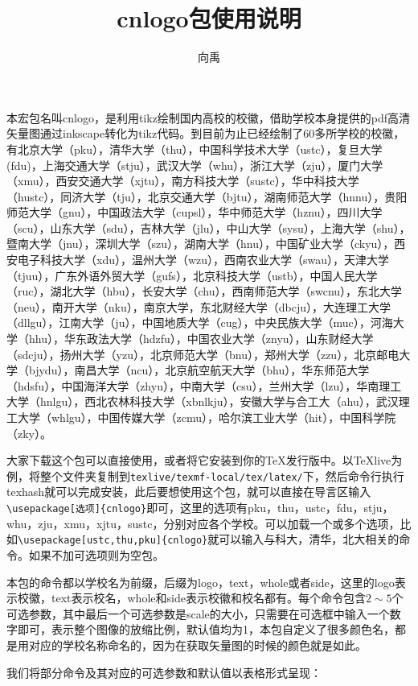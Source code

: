\documentclass{ctexart}
\title{cnlogo包使用说明}\author{向禹}
\begin{document}
\maketitle
本宏包名叫cnlogo，是利用tikz绘制国内高校的校徽，借助学校本身提供的pdf高清矢量图通过inkscape转化为tikz代码。到目前为止已经绘制了60多所学校的校徽，有北京大学（pku），清华大学（thu），中国科学技术大学（ustc），复旦大学(fdu)，上海交通大学（stju），武汉大学（whu），浙江大学（zju），厦门大学（xmu），西安交通大学（xjtu），南方科技大学（sustc），华中科技大学（hustc），同济大学（tju），北京交通大学（bjtu），湖南师范大学（hnnu），贵阳师范大学（gnu），中国政法大学（cupsl），华中师范大学（hznu），四川大学（scu），山东大学（sdu），吉林大学（jlu），中山大学（sysu），上海大学（shu），暨南大学（jnu），深圳大学（szu），湖南大学（hnu），中国矿业大学（ckyu），西安电子科技大学（xdu），温州大学（wzu），西南农业大学（swau），天津大学（tjuu），广东外语外贸大学（gufs），北京科技大学（ustb），中国人民大学（ruc），湖北大学（hbu），长安大学（chu），西南师范大学（swcnu），东北大学（neu），南开大学（nku），南京大学，东北财经大学（dbcju），大连理工大学（dllgu），江南大学（ju），中国地质大学（cug），中央民族大学（muc），河海大学（hhu），华东政法大学（hdzfu），中国农业大学（znyu），山东财经大学（sdcju），扬州大学（yzu），北京师范大学（bnu），郑州大学（zzu），北京邮电大学（bjydu），南昌大学（ncu），北京航空航天大学（bhu），华东师范大学（hdsfu），中国海洋大学（zhyu），中南大学（csu），兰州大学（lzu），华南理工大学（hnlgu），西北农林科技大学（xbnlkju），安徽大学与合工大（ahu），武汉理工大学（whlgu），中国传媒大学（zcmu），哈尔滨工业大学（hit），中国科学院（zky）。


大家下载这个包可以直接使用，或者将它安装到你的\TeX 发行版中。以\TeX live为例，将整个文件夹复制到\texttt{texlive/texmf-local/tex/latex/}下，然后命令行执行texhash就可以完成安装，此后要想使用这个包，就可以直接在导言区输入\verb|\usepackage[选项]{cnlogo}|即可，这里的选项有pku，thu，ustc，fdu，stju，whu，zju，xmu，xjtu，sustc，分别对应各个学校。可以加载一个或多个选项，比如\verb|\usepackage[ustc,thu,pku]{cnlogo}|就可以输入与科大，清华，北大相关的命令。如果不加可选项则为空包。

本包的命令都以学校名为前缀，后缀为logo，text，whole或者side，这里的logo表示校徽，text表示校名，whole和side表示校徽和校名都有。每个命令包含$2\sim5$个可选参数，其中最后一个可选参数是scale的大小，只需要在可选框中输入一个数字即可，表示整个图像的放缩比例，默认值均为1，本包自定义了很多颜色名，都是用对应的学校名称命名的，因为在获取矢量图的时候的颜色就是如此。

我们将部分命令及其对应的可选参数和默认值以表格形式呈现：
\end{document}
